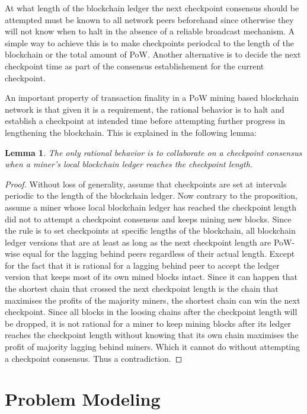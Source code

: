 \documentclass[conference]{IEEEtran}
\newtheorem{lemma}[theorem]{Lemma}
\begin{document}
At what length of the blockchain ledger the next checkpoint consensus should be attempted must be known to all network peers beforehand since otherwise they will not know when to halt in the absence of a reliable broadcast mechanism. A simple way to achieve this is to make checkpoints periodcal to the length of the blockchain or the total amount of PoW. Another alternative is to decide the next checkpoint time as part of the consensus establishement for the current checkpoint.    

An important property of transaction finality in a PoW mining based blockchain network is that given it is a requirement, the rational behavior is to halt and establish a checkpoint at intended time before attempting further progress in lengthening the blockchain. This is explained in the following lemma:

\begin{lemma}
\label{l-rationality}
The only rational behavior is to collaborate on a checkpoint consensus when a miner's local blockchain ledger reaches the checkpoint length.       
\end{lemma}

\begin{proof}
Without loss of generality, assume that checkpoints are set at intervals periodic to the length of the blockchain ledger. Now contrary to the proposition, assume a miner whose local blockchain ledger has reached the checkpoint length did not to attempt a checkpoint consensus and keeps mining new blocks. Since the rule is to set checkpoints at specific lengths of the blockchain, all blockchain ledger versions that are at least as long as the next checkpoint length are PoW-wise equal for the lagging behind peers regardless of their actual length. Except for the fact that it is rational for a lagging behind peer to accept the ledger version that keeps most of its own mined blocks intact. Since it can happen that the shortest chain that crossed the next checkpoint length is the chain that maximises the profits of the majority miners, the shortest chain can win the next checkpoint.          Since all blocks in the loosing chains after the checkpoint length will be dropped, it is not rational for a miner to keep mining blocks after its ledger reaches the checkpoint length without knowing that its own chain maximises the profit of majority lagging behind miners. Which it cannot do without attempting a checkpoint consensus. Thus a contradiction. 
\end{proof}


\section{Problem Modeling}
\label{s-model}
\end{document}
